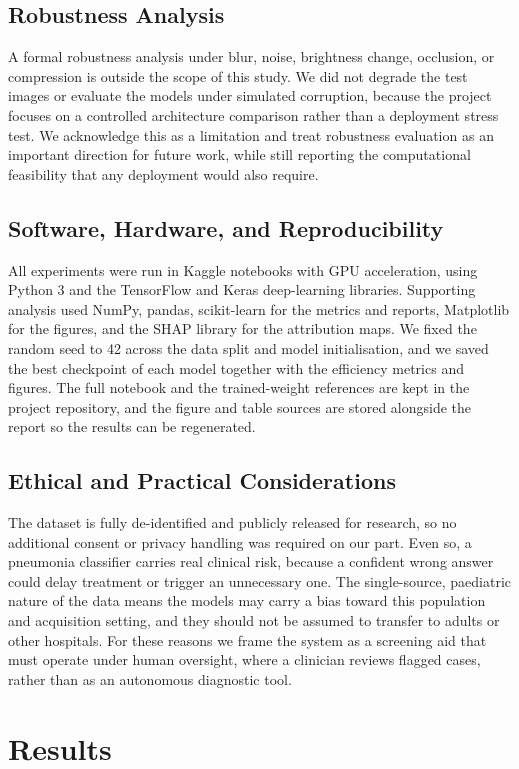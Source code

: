 \documentclass[preprint,12pt]{elsarticle}
\begin{document}
\subsection{Robustness Analysis}
A formal robustness analysis under blur, noise, brightness change, occlusion, or compression is outside the scope of this study.
We did not degrade the test images or evaluate the models under simulated corruption, because the project focuses on a controlled architecture comparison rather than a deployment stress test.
We acknowledge this as a limitation and treat robustness evaluation as an important direction for future work, while still reporting the computational feasibility that any deployment would also require.

\subsection{Software, Hardware, and Reproducibility}
All experiments were run in Kaggle notebooks with GPU acceleration, using Python 3 and the TensorFlow and Keras deep-learning libraries.
Supporting analysis used NumPy, pandas, scikit-learn for the metrics and reports, Matplotlib for the figures, and the SHAP library for the attribution maps.
We fixed the random seed to 42 across the data split and model initialisation, and we saved the best checkpoint of each model together with the efficiency metrics and figures.
The full notebook and the trained-weight references are kept in the project repository, and the figure and table sources are stored alongside the report so the results can be regenerated.

\subsection{Ethical and Practical Considerations}
The dataset is fully de-identified and publicly released for research, so no additional consent or privacy handling was required on our part.
Even so, a pneumonia classifier carries real clinical risk, because a confident wrong answer could delay treatment or trigger an unnecessary one.
The single-source, paediatric nature of the data means the models may carry a bias toward this population and acquisition setting, and they should not be assumed to transfer to adults or other hospitals.
For these reasons we frame the system as a screening aid that must operate under human oversight, where a clinician reviews flagged cases, rather than as an autonomous diagnostic tool.

\section{Results}
\end{document}

